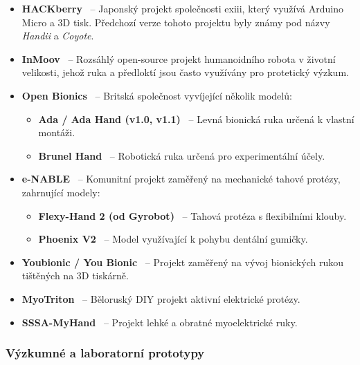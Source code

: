 \documentclass[FZS,DP]{tulthesis}
\begin{document}
\begin{itemize}
    \item \textbf{HACKberry}~\cite{Najman2017,Koprnicky2019,Nyrobtseva2018,Koprnicky2017eng,Trajlinek2021} – Japonský projekt společnosti exiii, který využívá Arduino Micro a 3D tisk. Předchozí verze tohoto projektu byly známy pod názvy \textit{Handii} a \textit{Coyote}.
    \item \textbf{InMoov}~\cite{Brazdil2020,Trajlinek2021,Nyrobtseva2018,Suman2025,Thomas2023110} – Rozsáhlý open-source projekt humanoidního robota v životní velikosti, jehož ruka a předloktí jsou často využívány pro protetický výzkum.
    \item \textbf{Open Bionics}~\cite{Najman2017,Brazdil2020,Koprnicky2019,Nyrobtseva2018,Safran2022,Koprnicky2017eng} – Britská společnost vyvíjející několik modelů:
    \begin{itemize}
        \item \textbf{Ada / Ada Hand (v1.0, v1.1)}~\cite{Najman2017,Brazdil2020,Koprnicky2017eng,Koprnicky2019} – Levná bionická ruka určená k vlastní montáži.
        \item \textbf{Brunel Hand}~\cite{Koprnicky2019,Thomas2023110,Koprnicky2017eng} – Robotická ruka určená pro experimentální účely.
    \end{itemize}
    \item \textbf{e-NABLE}~\cite{Najman2017,Koprnicky2019,Koprnicky2017eng} – Komunitní projekt zaměřený na mechanické tahové protézy, zahrnující modely:
    \begin{itemize}
        \item \textbf{Flexy-Hand 2 (od Gyrobot)}~\cite{Najman2017,Koprnicky2017eng} – Tahová protéza s flexibilními klouby.
        \item \textbf{Phoenix V2}~\cite{Koprnicky2017eng} – Model využívající k pohybu dentální gumičky.
    \end{itemize}
    \item \textbf{Youbionic / You Bionic}~\cite{Nyrobtseva2018,Safran2022,Koprnicky2017eng} – Projekt zaměřený na vývoj bionických rukou tištěných na 3D tiskárně.
    \item \textbf{MyoTriton}~\cite{Nyrobtseva2018} – Běloruský DIY projekt aktivní elektrické protézy.
    \item \textbf{SSSA-MyHand}~\cite{Nyrobtseva2018,Thomas2023110} – Projekt lehké a obratné myoelektrické ruky.
\end{itemize}

\subsubsection{Výzkumné a laboratorní prototypy}
\end{document}
